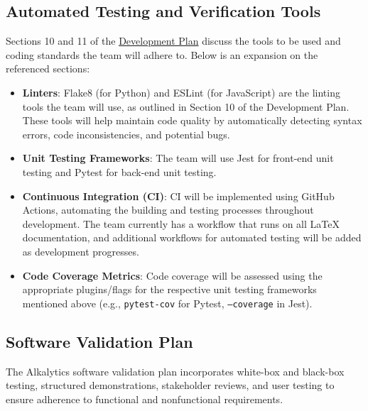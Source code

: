 \documentclass[12pt, titlepage]{article}
\begin{document}
\subsection{Automated Testing and Verification Tools} \label{testingTools}
Sections 10 and 11 of the
\href{https://github.com/SumanyaG/Alkalytics/blob/main/docs/DevelopmentPlan/DevelopmentPlan.pdf}{Development
Plan} discuss the tools to be used and coding standards the team will adhere to.
Below is an expansion on the referenced sections:
\begin{itemize}
  \item \textbf{Linters}: Flake8 (for Python) and ESLint (for JavaScript) are
  the linting tools the team will use, as outlined in Section 10 of the
  Development Plan. These tools will help maintain code quality by automatically
  detecting syntax errors, code inconsistencies, and potential bugs.
  \item \textbf{Unit Testing Frameworks}: The team will use Jest for front-end
  unit testing and Pytest for back-end unit testing.
  \item \textbf{Continuous Integration (CI)}: CI will be implemented using
  GitHub Actions, automating the building and testing processes throughout
  development. The team currently has a workflow that runs on all \LaTeX{}
  documentation, and additional workflows for automated testing will be added as
  development progresses. 
  \item \textbf{Code Coverage Metrics}: Code coverage will be assessed using the
  appropriate plugins/flags for the respective unit testing frameworks mentioned
  above (e.g., \texttt{pytest-cov} for Pytest, \texttt{--coverage} in Jest).
\end{itemize}

\subsection{Software Validation Plan}
The Alkalytics software validation plan incorporates white-box and black-box
testing, structured demonstrations, stakeholder reviews, and user testing to
ensure adherence to functional and nonfunctional requirements.
\end{document}
